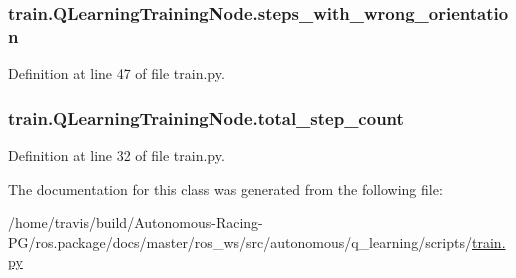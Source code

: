 \subsubsection[{\texorpdfstring{steps\+\_\+with\+\_\+wrong\+\_\+orientation}{steps_with_wrong_orientation}}]{\setlength{\rightskip}{0pt plus 5cm}train.\+Q\+Learning\+Training\+Node.\+steps\+\_\+with\+\_\+wrong\+\_\+orientation}\hypertarget{classtrain_1_1_q_learning_training_node_a87a28e543665823ac18758f6a4460d7a}{}\label{classtrain_1_1_q_learning_training_node_a87a28e543665823ac18758f6a4460d7a}


Definition at line 47 of file train.\+py.

\subsubsection[{\texorpdfstring{total\+\_\+step\+\_\+count}{total_step_count}}]{\setlength{\rightskip}{0pt plus 5cm}train.\+Q\+Learning\+Training\+Node.\+total\+\_\+step\+\_\+count}\hypertarget{classtrain_1_1_q_learning_training_node_aa583fe782e5ae47cc64dd44b92fd2e71}{}\label{classtrain_1_1_q_learning_training_node_aa583fe782e5ae47cc64dd44b92fd2e71}


Definition at line 32 of file train.\+py.



The documentation for this class was generated from the following file\+:\begin{DoxyCompactItemize}
\item 
/home/travis/build/\+Autonomous-\/\+Racing-\/\+P\+G/ros.\+package/docs/master/ros\+\_\+ws/src/autonomous/q\+\_\+learning/scripts/\hyperlink{q__learning_2scripts_2train_8py}{train.\+py}\end{DoxyCompactItemize}
